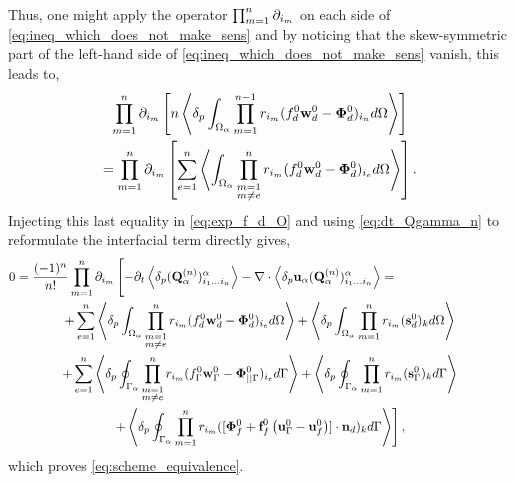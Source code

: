 Thus, one might apply the operator $\prod_{m=1}^{n} \partial_{i_m}$ on each side of \ref{eq:ineq_which_does_not_make_sens} and by noticing that the skew-symmetric part of the left-hand side of \ref{eq:ineq_which_does_not_make_sens} vanish, this leads to, 
\begin{multline}
    \partialp{1}{n}\left[
        n\pavg{\int_{\Omega_\alpha} \pri{1}{n-1} ( f_d^0 \textbf{w}_d^0-\bm\Phi_d^0)_{i_n} d\Omega}
        \right]\\
    =
    \partialp{1}{n}\left[
    \sum_{e=1}^{n} 
    \avg{
        \intO{
        \prod^{n}_{\substack{ m=1 \\m \neq e}} r_{i_m} (f_d^0 \textbf{w}_d^0  - \bm\Phi_d^0)_{i_e}
        }
    }
    \right]. 
    \label{eq:it_make_sens_again}
\end{multline}
Injecting this last equality in \ref{eq:exp_f_d_O} and using \ref{eq:dt_Qgamma_n} to reformulate the interfacial term directly gives, 
\begin{multline}
    0 = \frac{(-1)^n}{n!}
    \partialp{1}{n}
    \left[
        - \pddt \pavg{(\textbf{Q}_\alpha^{(n)})_{i_1\ldots i_n}^\alpha}
        - \div  \pavg{\textbf{u}_\alpha (\textbf{Q}_\alpha^{(n)})_{i_1\ldots i_n}^\alpha}
        = \phantom{\pOavg{\pri{}{n}}}\right.\\\left.
            +\sum_{e=1}^{n} 
        \pOavg{
            \prod^{n}_{\substack{ m=1 \\m \neq e}} r_{i_m} (f_d^0\textbf{w}_d^0  - \bm\Phi_d^0)_{i_e}
        }
        + \pOavg{ \pri{1}{n} (\textbf{s}_d^0)_k }\right.\\\left.
        +     
        \sum_{e=1}^{n} 
        \pSavg{
            \prod^{n}_{\substack{ m=1 \\m \neq e}} r_{i_m} (f_\Gamma^0\textbf{w}_\Gamma^0 - \bm\Phi_{||\Gamma}^0)_{i_e}
        }
        + \pSavg{ \pri{1}{n} (\textbf{s}_\Gamma^0)_k } \right.\\\left.
        +\pSavg{ \pri{1}{n} ([\bm\Phi_f^0 + \textbf{f}_f^0 \left(\textbf{u}_\Gamma^0 - \textbf{u}_f^0\right)]\cdot \textbf{n}_d)_k }
    \right],
\end{multline}
which proves \ref{eq:scheme_equivalence}.
